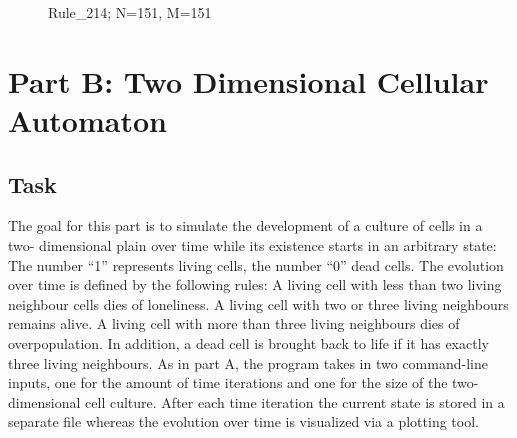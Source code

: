 \documentclass[12pt,a4paper]{article}
\begin{document}
\begin{figure}[H]
    \centering
    \caption{\small Rule\_214; N=151, M=151}
    \label{fig:your_label}
\end{figure}

\newpage





\section{Part B: Two Dimensional Cellular Automaton}
\vspace{1cm}

\subsection{Task}
The goal for this part is to simulate the development of a culture of cells in a two-
dimensional plain over time while its existence starts in an arbitrary state: The number “1”
represents living cells, the number “0” dead cells. The evolution over time is defined by
the following rules: A living cell with less than two living neighbour cells dies of
loneliness. A living cell with two or three living neighbours remains alive. A living cell
with more than three living neighbours dies of overpopulation. In addition, a dead cell is
brought back to life if it has exactly three living neighbours. As in part A, the program
takes in two command-line inputs, one for the amount of time iterations and one for the
size of the two-dimensional cell culture. After each time iteration the current state is stored
in a separate file whereas the evolution over time is visualized via a plotting tool.
\end{document}
